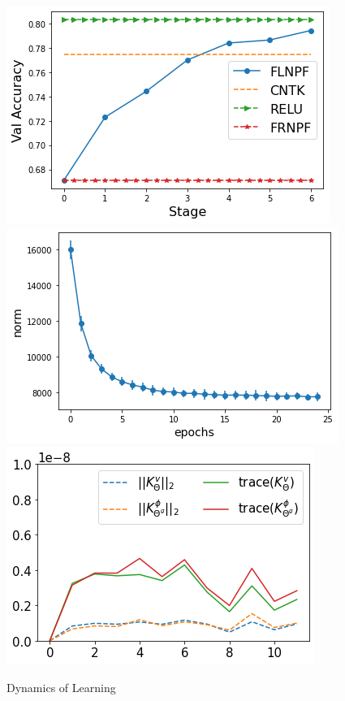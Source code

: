 \begin{figure}[!t]
\centering
\includegraphics[scale=0.25]{figs/gap.png}
\includegraphics[scale=0.25]{figs/path-gram.png}
\includegraphics[scale=0.25]{figs/kvkphi.png}
\caption{Dynamics of Learning}
\label{fig:dynamics}
\end{figure}
